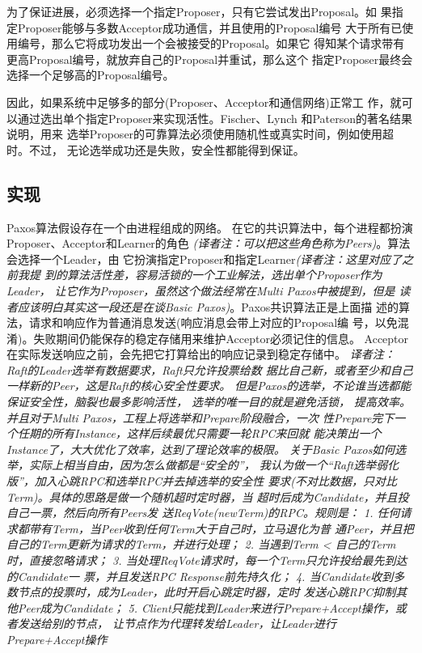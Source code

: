为了保证进展，必须选择一个指定Proposer，只有它尝试发出Proposal。如
果指定Proposer能够与多数Acceptor成功通信，并且使用的Proposal编号
大于所有已使用编号，那么它将成功发出一个会被接受的Proposal。如果它
得知某个请求带有更高Proposal编号，就放弃自己的Proposal并重试，那么这个
指定Proposer最终会选择一个足够高的Proposal编号。

因此，如果系统中足够多的部分(Proposer、Acceptor和通信网络)正常工
作，就可以通过选出单个指定Proposer来实现活性。Fischer、Lynch
和Paterson的著名结果\cite{fischer1985impossibility}说明，用来
选举Proposer的可靠算法必须使用随机性或真实时间，例如使用超时。不过，
无论选举成功还是失败，安全性都能得到保证。

\subsection{实现}
Paxos算法\cite{lamport1998parttime}假设存在一个由进程组成的网络。
在它的共识算法中，每个进程都扮演Proposer、Acceptor和Learner的角色
\emph{(译者注：可以把这些角色称为Peers)}。算法会选择一个Leader，由
它扮演指定Proposer和指定Learner\emph{(译者注：这里对应了之前我提
到的算法活性差，容易活锁的一个工业解法，选出单个Proposer作为Leader，
让它作为Proposer，虽然这个做法经常在Multi Paxos中被提到，但是
读者应该明白其实这一段还是在谈Basic Paxos)}。Paxos共识算法正是上面描
述的算法，请求和响应作为普通消息发送(响应消息会带上对应的Proposal编
号，以免混淆)。失败期间仍能保存的稳定存储用来维护Acceptor必须记住的信息。
Acceptor在实际发送响应之前，会先把它打算给出的响应记录到稳定存储中。
\emph{译者注：Raft的Leader选举有数据要求，Raft只允许投票给数
据比自己新，或者至少和自己一样新的Peer，这是Raft的核心安全性要求。
但是Paxos的选举，不论谁当选都能保证安全性，脑裂也最多影响活性，
选举的唯一目的就是避免活锁，
提高效率。并且对于Multi Paxos，工程上将选举和Prepare阶段融合，一次
性Prepare完下一个任期的所有Instance，这样后续最优只需要一轮RPC来回就
能决策出一个Instance了，大大优化了效率，达到了理论效率的极限。
关于Basic Paxos如何选举，实际上相当自由，因为怎么做都是“安全的”，
我认为做一个“Raft选举弱化版”，加入心跳RPC和选举RPC并去掉选举的安全性
要求(不对比数据，只对比Term)。具体的思路是做一个随机超时定时器，当
超时后成为Candidate，并且投自己一票，然后向所有Peers发
送ReqVote(newTerm)的RPC。规则是：
1. 任何请求都带有Term，当Peer收到任何Term大于自己时，立马退化为普
通Peer，并且把自己的Term更新为请求的Term，并进行处理；
2. 当遇到Term < 自己的Term时，直接忽略请求；
3. 当处理ReqVote请求时，每一个Term只允许投给最先到达的Candidate一
票，并且发送RPC Response前先持久化；
4. 当Candidate收到多数节点的投票时，成为Leader，此时开启心跳定时器，定时
发送心跳RPC抑制其他Peer成为Candidate；
5. Client只能找到Leader来进行Prepare+Accept操作，或者发送给别的节点，
让节点作为代理转发给Leader，让Leader进行Prepare+Accept操作}

